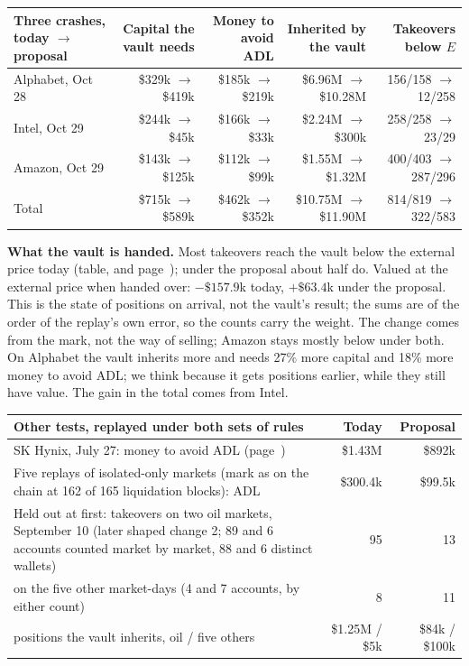 {\renewcommand{\arraystretch}{1.2}
{\small
\begin{tabularx}{\textwidth}{@{}>{\raggedright\arraybackslash}Xrrrr@{}}
\toprule
Three crashes, today $\rightarrow$ proposal & Capital the vault needs & Money to avoid ADL & Inherited by the vault & Takeovers below $E$\\
\midrule
Alphabet, Oct 28 & \$329k $\rightarrow$ \$419k & \$185k $\rightarrow$ \$219k & \$6.96M $\rightarrow$ \$10.28M & 156/158 $\rightarrow$ 12/258\\
Intel, Oct 29 & \$244k $\rightarrow$ \$45k & \$166k $\rightarrow$ \$33k & \$2.24M $\rightarrow$ \$300k & 258/258 $\rightarrow$ 23/29\\
Amazon, Oct 29 & \$143k $\rightarrow$ \$125k & \$112k $\rightarrow$ \$99k & \$1.55M $\rightarrow$ \$1.32M & 400/403 $\rightarrow$ 287/296\\
Total & \$715k $\rightarrow$ \$589k & \$462k $\rightarrow$ \$352k & \$10.75M $\rightarrow$ \$11.90M & 814/819 $\rightarrow$ 322/583\\
\bottomrule
\end{tabularx}}

\textbf{What the vault is handed.} Most takeovers reach the vault below the external price today (table, and page~\pageref{sec:lag}); under the proposal about half do. Valued at the external price when handed over: $-\$157.9$k today, $+\$63.4$k under the proposal. This is the state of positions on arrival, not the vault's result; the sums are of the order of the replay's own error, so the counts carry the weight. The change comes from the mark, not the way of selling; Amazon stays mostly below under both. On Alphabet the vault inherits more and needs 27\% more capital and 18\% more money to avoid ADL; we think because it gets positions earlier, while they still have value. The gain in the total comes from Intel.

{\small
\begin{tabularx}{\textwidth}{@{}>{\raggedright\arraybackslash}Xrr@{}}
\toprule
Other tests, replayed under both sets of rules & Today & Proposal\\
\midrule
SK Hynix, July 27: money to avoid ADL (page~\pageref{sec:skhx2}) & \$1.43M & \$892k\\
Five replays of isolated-only markets (mark as on the chain at 162 of 165 liquidation blocks): ADL & \$300.4k & \$99.5k\\
Held out at first: takeovers on two oil markets, September 10 (later shaped change 2; 89 and 6 accounts counted market by market, 88 and 6 distinct wallets) & 95 & 13\\
\quad on the five other market-days (4 and 7 accounts, by either count) & 8 & 11\\
\quad positions the vault inherits, oil / five others & \$1.25M / \$5k & \$84k / \$100k\\
\bottomrule
\end{tabularx}}




\vspace{1ex}
}


